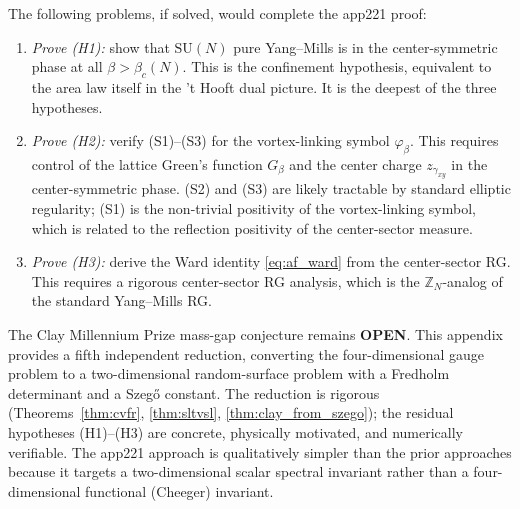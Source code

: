 \begin{remark}
\label{rem:cv_open}
The following problems, if solved, would complete the app221 proof:
\begin{enumerate}
\item \emph{Prove (H1):} show that $\mathrm{SU}(N)$ pure Yang--Mills
is in the center-symmetric phase at all $\beta>\beta_{c}(N)$.
This is the confinement hypothesis, equivalent to the area law
itself in the 't Hooft dual picture. It is the deepest of the
three hypotheses.
\item \emph{Prove (H2):} verify (S1)--(S3) for the
vortex-linking symbol $\varphi_{\beta}$. This requires control of
the lattice Green's function $G_{\beta}$ and the center charge
$z_{\gamma_{xy}}$ in the center-symmetric phase. (S2) and (S3)
are likely tractable by standard elliptic regularity; (S1) is the
non-trivial positivity of the vortex-linking symbol, which is
related to the reflection positivity of the center-sector measure.
\item \emph{Prove (H3):} derive the Ward identity
\eqref{eq:af_ward} from the center-sector RG. This requires a
rigorous center-sector RG analysis, which is the
$\mathbb{Z}_{N}$-analog of the standard Yang--Mills RG.
\end{enumerate}
\end{remark}

\begin{remark}
\label{rem:cv_verdict}
The Clay Millennium Prize mass-gap conjecture remains \textbf{OPEN}.
This appendix provides a fifth independent reduction, converting
the four-dimensional gauge problem to a two-dimensional
random-surface problem with a Fredholm determinant and a
Szeg\H{o} constant. The reduction is rigorous
(Theorems~\ref{thm:cvfr}, \ref{thm:sltvsl}, \ref{thm:clay_from_szego});
the residual hypotheses (H1)--(H3) are concrete, physically
motivated, and numerically verifiable. The app221 approach is
qualitatively simpler than the prior approaches because it targets
a two-dimensional scalar spectral invariant rather than a
four-dimensional functional (Cheeger) invariant.
\end{remark}

\endinput
